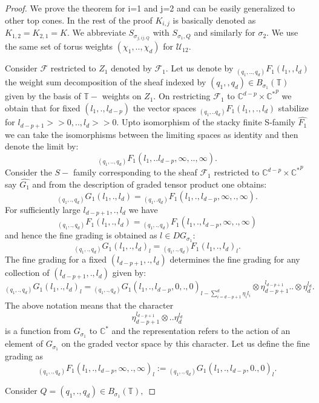 \documentclass[10pt,a4paper]{amsart}
\begin{document}
\begin{proof}
We prove the theorem for i=1 and j=2 and can be easily generalized to other top cones. In the rest of the proof $K_{i,j}$ is basically denoted as $K_{1,2}=K_{2,1}=K.$
We abbreviate $S_{\sigma_{j,ij,Q}}$ with $S_{\sigma_1,Q}$ and similarly for $\sigma_2.$ We use the same set of torus weights $(\chi_1,..,\chi_d)$ for $\mathscr{U}_{12}.$\par 
Consider $\mathscr{F}$ restricted to $Z_1$ denoted by $\mathscr{F}_1.$ Let us denote by ${}_{(q_1,..,q_d)}F_1(l_1,,l_d)$ the weight sum decomposition of the sheaf indexed by $(q_1,,q_d)\in B_{\sigma_{1}}(\mathbb{T})$ given by the basis of $\mathbb{T}-$ weights on $Z_1.$ On restricting $\mathscr{F}_1$ to $\mathbb{C}^{d-p}\times \mathbb{C^*}^p$ we obtain that for fixed $(l_1,.,l_{d-p})$ the vector spaces ${}_{(q_1,..q_d)}F_1(l_1,,.,l_d)$ stabilize for $l_{d-p+1}>>0,..,l_{d}>>0.$
Upto isomorphism of the stacky finite S-family $\hat{F_1}$ we can take the isomorphisms between the limiting spaces as identity and then denote the limit by: $${}_{(q_1,..,q_d)}F_1(l_1,..l_{d-p},\infty,..,\infty).$$ Consider the $S-$ family corresponding to the sheaf $\mathscr{F}_1$ restricted to $\mathbb{C}^{d-p}\times \mathbb{C^*}^p$ say $\hat{G_1}$ and from the description of graded tensor product one obtains:
$${}_{(q_1,.,q_d)}G_{1}(l_1,.,l_d)={}_{(q_1,.q_d)}F_{1}(l_1,.,l_{d-p},\infty,.,\infty).$$ For sufficiently large $l_{d-p+1},.,l_d$ we have $${}_{(q_1,.,q_d)}F_1(l_1,.,l_d)={}_{(q_1,.,q_d)}F_1(l_1,.,l_{d-p},\infty,.,\infty)$$ and hence the fine grading is obtained as $l\in DG_{\sigma_1}$:
$${}_{(q_1,.,q_d)}G_{1}(l_1,.,l_d)_l={}_{(q_1,.,q_d)}F_{1}(l_1,.,l_d)_l.$$ The fine grading for a fixed $(l_{d-p+1},.,l_{d})$ determines the fine grading for any collection of $(l_{d-p+1},.,l_{d})$ given by:
$${}_{(q_1,.,q_d)}G_1(l_1,.,l_d)_{l}={}_{(q_1,.,q_d)}G_1(l_1,.,l_{d-p},0,.,0)_{l-\sum_{i=d-p+1}^{d}\eta_il_i}\otimes \eta_{d-p+1}^{l_{d-p+1}}..\otimes \eta_{d}^{l_{d}}.$$
The above notation means that the character $$\eta_{d-p+1}^{l_{d-p+1}}\otimes.. \eta_{d}^{l_{d}}$$ is a function from $G_{\sigma_{1}}$ to $\mathbb{C}^{*}$ and the representation refers to the action of an element of $G_{\sigma_{1}}$ on the graded vector space by this character.
Let us define the fine grading as $${}_{(q_1,.,q_d)}F_1(l_1,.,l_{d-p},\infty,.,\infty)_{l}:={}_{(q_1,.,q_d)}G_{1}(l_1,.,l_{d-p},0.,0)_{l}.$$\par
Consider $Q=(q_1,.,q_d)\in B_{\sigma_1}(\mathbb{T}),$ %

\end{proof}
\end{document}
